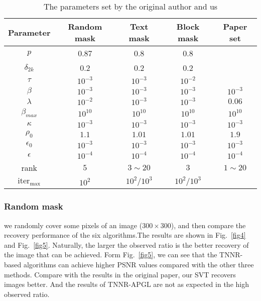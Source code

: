 \documentclass[fontset=windows]{article}
\begin{document}
{\begin{table}
    \caption{The parameters set by the original author and us}
    \label{t1}
    \centering
    \renewcommand{\arraystretch}{1.25} 
    \begin{tabular}{ccccc}
        \toprule
        Parameter  & Random mask & Text mask  & Block mask & Paper set\\
        \midrule
        $p$ & 0.87 & 0.8 & 0.8 & \\
        $\delta_{2k}$ & 0.2 & 0.2 & 0.2 & \\ 
        $\tau$ & $10^{-3}$ & $10^{-3}$ & $10^{-2}$ & \\
        $\beta$  & $10^{-3}$  & $10^{-3}$ & $10^{-3}$ & $10^{-3}$\\
        $\lambda$ & $ 10^{-2} $ & $10^{-3}$ & $10^{-3}$ & $0.06$\\
        $\beta_{max}$ & $10^{10}$ & $10^{10}$ & $10^{10}$ & $10^{10}$\\
        $\kappa$ & $10^{-3}$ & $10^{-3}$ & $10^{-3}$ & $10^{-3}$\\
        $\rho_0$ & $1.1$ & $1.01$ & $1.01$ & $1.9$\\
        $\epsilon_0$ & $10^{-3}$ & $10^{-3}$ & $10^{-3}$ & $10^{-3}$\\
        $\epsilon$ & $10^{-4}$ & $10^{-4}$ & $10^{-4}$ & $10^{-4}$\\
        rank & $5$ & $3\sim 20$ & $3$ & $1\sim 20$\\
        $\text{iter}_{\max}$ & $10^2$ & $10^2/10^3$ & $10^2/10^3$ & \\
        \bottomrule
    \end{tabular}
\end{table}

\subsubsection{Random mask}
\label{random}
we randomly cover some pixels of an image ($300 \times 300$), and then compare the recovery performance of the six algorithms.The results are shown in Fig.~\ref{fig4} and Fig.~\ref{fig5}. Naturally, the larger the observed ratio is the better recovery of the image that can be achieved. Form Fig.~\ref{fig5}, we can see that the TNNR-based algorithms can achieve higher PSNR values compared with the other three methods. Compare with the results in the original paper, our SVT recovers images better. And the results of TNNR-APGL are not as expected in the high observed ratio.

}
\end{document}

